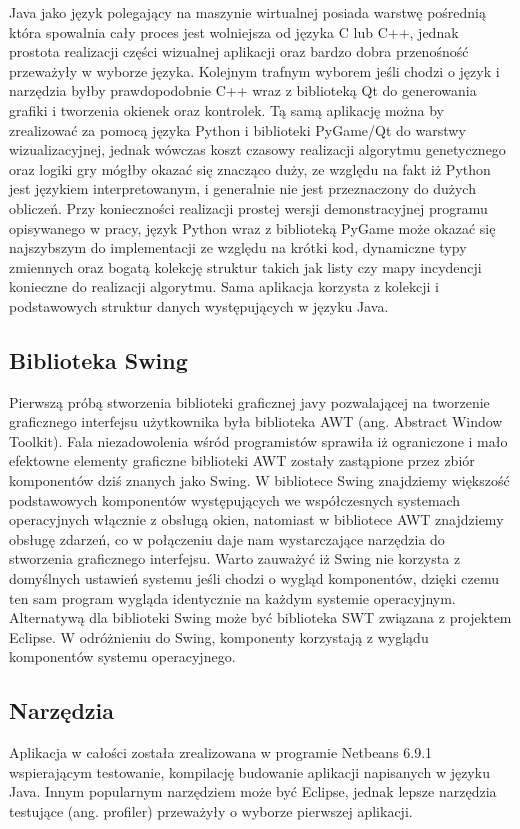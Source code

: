 \begin{par}
	Java jako język polegający na maszynie wirtualnej posiada warstwę pośrednią która spowalnia cały proces jest wolniejsza od języka C lub C++, jednak prostota realizacji części wizualnej aplikacji oraz bardzo dobra przenośność przeważyły w wyborze języka.
	Kolejnym trafnym wyborem jeśli chodzi o język i narzędzia byłby prawdopodobnie C++ wraz z biblioteką Qt do generowania grafiki i tworzenia okienek oraz kontrolek.
	Tą samą aplikację można by zrealizować za pomocą języka Python i biblioteki PyGame/Qt do warstwy wizualizacyjnej, jednak wówczas koszt czasowy realizacji algorytmu genetycznego oraz logiki gry mógłby okazać się znacząco duży, ze względu na fakt iż Python jest językiem interpretowanym, i generalnie nie jest przeznaczony do dużych obliczeń.
	Przy konieczności realizacji prostej wersji demonstracyjnej programu opisywanego w pracy, język Python wraz z biblioteką PyGame może okazać się najszybszym do implementacji ze względu na krótki kod, dynamiczne typy zmiennych oraz bogatą kolekcję struktur takich jak listy czy mapy incydencji konieczne do realizacji algorytmu.
	Sama aplikacja korzysta z kolekcji i podstawowych struktur danych występujących w języku Java.
	\subsection{Biblioteka Swing}
	Pierwszą próbą stworzenia biblioteki graficznej javy pozwalającej na tworzenie graficznego interfejsu użytkownika była biblioteka AWT (ang. Abstract Window Toolkit).
	Fala niezadowolenia wśród programistów sprawiła iż ograniczone i mało efektowne elementy graficzne biblioteki AWT zostały zastąpione przez zbiór komponentów dziś znanych jako Swing.
	W bibliotece Swing znajdziemy większość podstawowych komponentów występujących we współczesnych systemach operacyjnych włącznie z obsługą okien, natomiast w bibliotece AWT znajdziemy obsługę zdarzeń, co w połączeniu daje nam wystarczające narzędzia do stworzenia graficznego interfejsu.
	Warto zauważyć iż Swing nie korzysta z domyślnych ustawień systemu jeśli chodzi o wygląd komponentów, dzięki czemu ten sam program wygląda identycznie na każdym systemie operacyjnym.
	Alternatywą dla biblioteki Swing może być biblioteka SWT związana z projektem Eclipse.
	W odróżnieniu do Swing, komponenty korzystają z wyglądu komponentów systemu operacyjnego.
	\subsection{Narzędzia}
	Aplikacja w całości została zrealizowana w programie Netbeans 6.9.1 wspierającym testowanie, kompilację budowanie aplikacji napisanych w języku Java.
	Innym popularnym narzędziem może być Eclipse, jednak lepsze narzędzia testujące (ang. profiler) przeważyły o wyborze pierwszej aplikacji.
\end{par}
